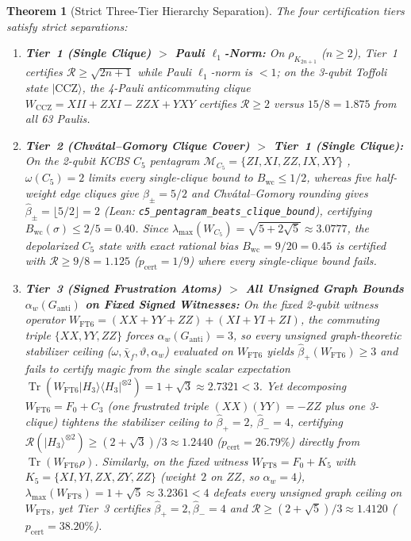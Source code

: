 \documentclass[11pt,a4paper]{article}
\newtheorem{theorem}{Theorem}[section]
\theoremstyle{definition}
\theoremstyle{remark}
\newcommand{\RoM}{\mathcal{R}}
\newcommand{\Tr}{\operatorname{Tr}}
\newcommand{\Code}[1]{{\small\texttt{#1}}}
\begin{document}
\begin{theorem}[Strict Three-Tier Hierarchy Separation]
\label{thm:hierarchy}
The four certification tiers satisfy strict separations:
\begin{enumerate}[label=(\alph*),leftmargin=1.8em,itemsep=2pt]
  \item \textbf{Tier~1 (Single Clique) $>$ Pauli $\ell_1$-Norm:} On $\rho_{K_{2n+1}}$ ($n \ge 2$), Tier~1 certifies $\RoM \ge \sqrt{2n+1}$ while Pauli $\ell_1$-norm is $< 1$; on the 3-qubit Toffoli state $|\mathrm{CCZ}\rangle$, the 4-Pauli anticommuting clique $W_{\mathrm{CCZ}} = XII + ZXI - ZZX + YXY$ certifies $\RoM \ge 2$ versus $15/8 = 1.875$ from all 63 Paulis.
  \item \textbf{Tier~2 (Chv\'atal--Gomory Clique Cover) $>$ Tier~1 (Single Clique):} On the 2-qubit KCBS $C_5$ pentagram $\mathcal{M}_{C_5} = \{ZI, XI, ZZ, IX, XY\}$ \cite{Klyachko2008KCBS,Howard2014Contextuality}, $\omega(C_5) = 2$ limits every single-clique bound to $B_{\mathrm{wc}} \le 1/2$, whereas five half-weight edge cliques give $\beta_\pm = 5/2$ and Chv\'atal--Gomory rounding gives $\hat{\beta}_\pm = \lfloor 5/2 \rfloor = 2$ (Lean: \Code{c5\_\allowbreak pentagram\_\allowbreak beats\_\allowbreak clique\_\allowbreak bound}), certifying $B_{\mathrm{wc}}(\sigma) \le 2/5 = 0.40$. Since $\lambda_{\max}(W_{C_5}) = \sqrt{5 + 2\sqrt{5}} \approx 3.0777$, the depolarized $C_5$ state with exact rational bias $B_{\mathrm{wc}} = 9/20 = 0.45$ is certified with $\RoM \ge 9/8 = 1.125$ ($p_{\mathrm{cert}} = 1/9$) where every single-clique bound fails.
  \item \textbf{Tier~3 (Signed Frustration Atoms) $>$ All Unsigned Graph Bounds $\alpha_w(G_{\mathrm{anti}})$ on Fixed Signed Witnesses:} On the fixed 2-qubit witness operator $W_{\mathrm{FT6}} = (XX + YY + ZZ) + (XI + YI + ZI)$, the commuting triple $\{XX, YY, ZZ\}$ forces $\alpha_w(G_{\mathrm{anti}}) = 3$, so every unsigned graph-theoretic stabilizer ceiling ($\omega, \bar{\chi}_f, \vartheta, \alpha_w$) evaluated on $W_{\mathrm{FT6}}$ yields $\hat{\beta}_+(W_{\mathrm{FT6}}) \ge 3$ and fails to certify magic from the single scalar expectation $\Tr(W_{\mathrm{FT6}}|H_3\rangle\langle H_3|^{\otimes 2}) = 1 + \sqrt{3} \approx 2.7321 < 3$. Yet decomposing $W_{\mathrm{FT6}} = F_0 + C_3$ (one frustrated triple $(XX)(YY) = -ZZ$ plus one 3-clique) tightens the stabilizer ceiling to $\hat{\beta}_+ = 2$, $\hat{\beta}_- = 4$, certifying $\RoM(|H_3\rangle^{\otimes 2}) \ge (2 + \sqrt{3})/3 \approx 1.2440$ ($p_{\mathrm{cert}} = 26.79\%$) directly from $\Tr(W_{\mathrm{FT6}}\rho)$. Similarly, on the fixed witness $W_{\mathrm{FT8}} = F_0 + K_5$ with $K_5 = \{XI, YI, ZX, ZY, ZZ\}$ (weight~$2$ on $ZZ$, so $\alpha_w = 4$), $\lambda_{\max}(W_{\mathrm{FT8}}) = 1 + \sqrt{5} \approx 3.2361 < 4$ defeats every unsigned graph ceiling on $W_{\mathrm{FT8}}$, yet Tier~3 certifies $\hat{\beta}_+ = 2, \hat{\beta}_- = 4$ and $\RoM \ge (2+\sqrt{5})/3 \approx 1.4120$ ($p_{\mathrm{cert}} = 38.20\%$).
\end{enumerate}
\end{theorem}
\end{document}
